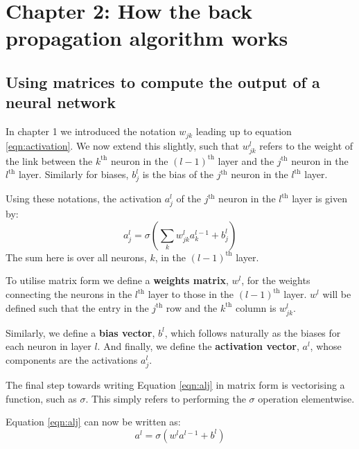 \documentclass[11pt]{article}
\begin{document}
\clearpage


\section{Chapter 2: How the back propagation algorithm works}
\label{sec:org28ed78e}
\subsection{Using matrices to compute the output of a neural network}
\label{sec:orga8d63b1}
In chapter 1 we introduced the notation \(w_{jk}\) leading up to equation \ref{eqn:activation}. We now extend this slightly, such that \(w^l_{jk}\) refers to the weight of the link between the \(k^{\text{th}}\) neuron in the \((l-1)^{\text{th}}\) layer and the \(j^{\text{th}}\) neuron in the \(l^{\text{th}}\) layer. Similarly for biases, \(b^l_j\) is the bias of the \(j^{\text{th}}\) neuron in the \(l^{\text{th}}\) layer.

Using these notations, the activation \(a^l_j\) of the \(j^{\text{th}}\) neuron in the \(l^{\text{th}}\) layer is given by:
\begin{equation} \label{eqn:alj}
a^l_j = \sigma ( \sum_k w^l_{jk} a^{l-1}_k + b^l_j )
\end{equation}
The sum here is over all neurons, \(k\), in the \((l-1)^{\text{th}}\) layer.

\vspace{0.3cm}

To utilise matrix form we define a \textbf{weights matrix}, \(w^l\), for the weights connecting the neurons in the \(l^{\text{th}}\) layer to those in the \((l-1)^{\text{th}}\) layer. \(w^l\) will be defined such that the entry in the \(j^{\text{th}}\) row and the \(k^{\text{th}}\) column is \(w^l_{jk}\).

Similarly, we define a \textbf{bias vector}, \(b^l\), which follows naturally as the biases for each neuron in layer \(l\). And finally, we define the \textbf{activation vector}, \(a^l\), whose components are the activations \(a^l_j\).

The final step towards writing Equation \ref{eqn:alj} in matrix form is vectorising a function, such as \(\sigma\). This simply refers to performing the \(\sigma\) operation elementwise.

\vspace{0.3cm}

Equation \ref{eqn:alj} can now be written as:
\begin{equation} \label{eqn:almatrix}
a^l = \sigma(w^l a^{l-1} + b^l)
\end{equation}
\end{document}
